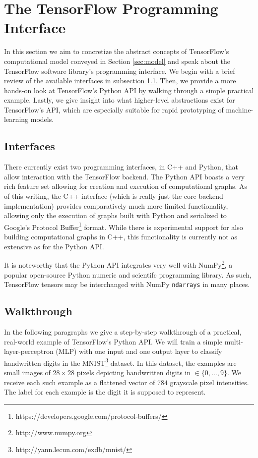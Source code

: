 \section{The TensorFlow Programming Interface}\label{sec:code}

In this section we aim to concretize the abstract concepts of TensorFlow's
computational model conveyed in Section \ref{sec:model} and speak about the
TensorFlow software library's programming interface. We begin with a brief
review of the available interfaces in subsection
\ref{sec:code-interfaces}. Then, we provide a more hands-on look at TensorFlow's
Python API by walking through a simple practical example. Lastly, we give
insight into what higher-level abstractions exist for TensorFlow's API, which
are especially suitable for rapid prototyping of machine-learning models.

\subsection{Interfaces}\label{sec:code-interfaces}

There currently exist two programming interfaces, in C++ and Python, that allow
interaction with the TensorFlow backend. The Python API boasts a very rich
feature set allowing for creation and execution of computational graphs. As of
this writing, the C++ interface (which is really just the core backend
implementation) provides comparatively much more limited functionality, allowing
only the execution of graphs built with Python and serialized to Google's
Protocol Buffer\footnote{https://developers.google.com/protocol-buffers/}
format. While there is experimental support for also building computational
graphs in C++, this functionality is currently not as extensive as for the
Python API.

It is noteworthy that the Python API integrates very well with
NumPy\footnote{http://www.numpy.org}, a popular open-source Python numeric and
scientifc programming library. As such, TensorFlow tensors may be interchanged
with NumPy \texttt{ndarrays} in many places.

\subsection{Walkthrough}\label{sec:code-walk}

In the following paragraphs we give a step-by-step walkthrough of a practical,
real-world example of TensorFlow's Python API. We will train a simple
multi-layer-perceptron (MLP) with one input and one output layer to classify
handwritten digits in the MNIST\footnote{http://yann.lecun.com/exdb/mnist/}
dataset. In this dataset, the examples are small images of $28 \times 28$ pixels
depicting handwritten digits in $\in \{0, \dots, 9\}$. We receive each such
example as a flattened vector of $784$ grayscale pixel intensities. The label
for each example is the digit it is supposed to represent.

